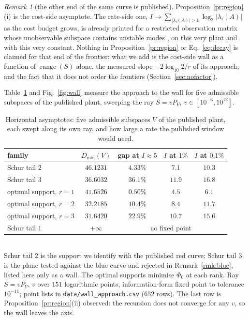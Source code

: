 \documentclass[journal]{IEEEtran}
\theoremstyle{remark}
\newtheorem{remark}{Remark}
\begin{document}
\begin{remark}[the other end of the same curve is published]
\label{rmk:dual}
Proposition~\ref{pr:region}(i) is the cost-side asymptote. The rate-side one,
$I\to\sum_{|\lambda_i(A)|>1}\log_2|\lambda_i(A)|$ as the cost budget grows, is
already printed for a restricted observation matrix whose unobservable subspace
contains unstable modes \cite[Sec.~IV-A, Fig.~3]{sabag2021reducing}, on this very
plant and with this very constant. Nothing in Proposition~\ref{pr:region} or
Eq.~\eqref{eq:decay} is claimed for that end of the frontier: what we add is the
cost-side wall as a function of $\operatorname{range}(S)$ alone, the measured
slope $-2\log_{10}2/r$ of its approach, and the fact that it does not order the
frontiers (Section~\ref{sec:nofactor}).
\end{remark}

Table~\ref{tab:wall} and Fig.~\ref{fig:wall} measure the approach to the wall for
five admissible subspaces of the published plant, sweeping the ray
$S=vP_V$, $v\in[10^{-3},10^{12}]$.

\begin{table}[h]
 \centering\caption{Horizontal asymptotes: five admissible subspaces $V$ of
 the published plant, each swept along its own ray, and how large a rate the
 published window would need.}
 \label{tab:wall}
 \begin{tabularx}{\columnwidth}{Xcccc}
 \hline
 family & $D_{\min}(V)$ & gap at $I\approx5$ &
 $I$ at $1\%$ & $I$ at $0.1\%$ \\
 \hline
 Schur tail $2$ & $46.1231$ & $4.33\%$ & $7.1$ & $10.3$ \\
 Schur tail $3$ & $36.6032$ & $36.1\%$ & $11.9$ & $16.8$ \\
 optimal support, $r=1$ & $41.6526$ & $0.50\%$ & $4.5$ & $6.1$ \\
 optimal support, $r=2$ & $32.2185$ & $10.4\%$ & $8.4$ & $11.7$ \\
 optimal support, $r=3$ & $31.6420$ & $22.9\%$ & $10.7$ & $15.6$ \\
 Schur tail $1$ & $+\infty$ & \multicolumn{3}{c}{no fixed point} \\
 \hline
 \end{tabularx}
 \\[1pt]{\scriptsize Schur tail $2$ is the support we identify with the
 published red curve; Schur tail $3$ is the plane tested against the blue curve
 and rejected in Remark~\ref{rmk:blue}, listed here only as a wall. The optimal
 supports minimise $\Phi_0$ at each rank. Ray $S=vP_V$, $v$ over $151$
 logarithmic points,
 information-form fixed point to tolerance $10^{-11}$; point lists in
 \texttt{data/wall\_approach.csv} ($652$ rows). The last row is
 Proposition~\ref{pr:region}(ii) observed: the recursion does not converge for
 any $v$, so the wall leaves the axis.}
\end{table}
\end{document}
